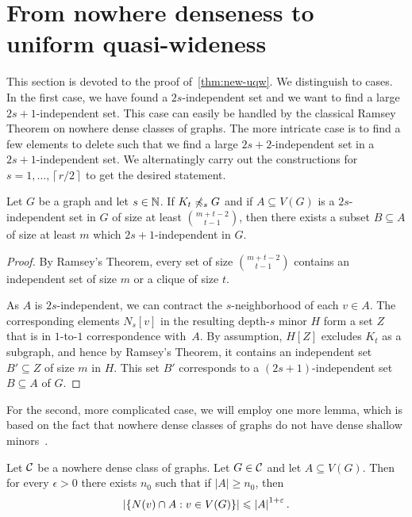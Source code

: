 \section{From nowhere denseness to uniform quasi-wideness}\label{sec:uqw}

This section is devoted to the proof of~\cref{thm:new-uqw}. 
We distinguish to cases. In the first case, we have found a 
$2s$-independent set and we want to find a large $2s+1$-independent
set. This case can easily be handled by the classical Ramsey 
Theorem on nowhere dense classes of graphs. The more
intricate case is to find a few elements to delete such that
we find a large $2s+2$-independent set in a $2s+1$-independent set. 
We alternatingly carry out the constructions for $s=1,\ldots, \left\lceil r/2\right\rceil$ to 
get the desired statement. 


\begin{lemma}\label{lem:ramsey1}
Let $G$ be a graph and let $s\in \mathbb{N}$. If $K_t\not\preccurlyeq_{s} G$ and 
if $A\subseteq V(G)$ is a $2s$-independent set in $G$ of
size at least $\binom{m+t-2}{t-1}$, then there exists
a subset $B\subseteq A$ of size at least $m$ which $2s+1$-independent in $G$. 
\end{lemma}
\begin{proof}
By Ramsey's Theorem, every set of size $\binom{m+t-2}{t-1}$ contains an
independent set of size $m$ or a clique of size $t$. 

As $A$ is $2s$-independent, we can contract the $s$-neighborhood
of each $v\in A$. The corresponding elements $N_s[v]$ in the resulting 
depth-$s$ minor $H$ form a set $Z$ that is in \mbox{$1$-to-$1$} correspondence 
with~$A$. By assumption, 
$H[Z]$ excludes $K_t$ as a subgraph, and hence by Ramsey's Theorem,
it contains an independent set $B'\subseteq Z$ of size $m$ in $H$. 
This set $B'$ corresponds to a $(2s+1)$-independent set $B\subseteq A$ of $G$. 
\end{proof}

For the second, more complicated case, 
we will employ one more lemma, which is based on the fact that
nowhere dense classes of graphs do not have dense 
shallow minors~\cite{dvorak2007asymptotical,jiang2011compact}. 

\begin{lemma}\label{lem:diversity}
Let $\mathcal{C}$ be a nowhere dense class of graphs. Let $G\in \mathcal{C}$ and let $A\subseteq V(G)$. 
Then for every $\epsilon>0$ there exists $n_0$ such that if $|A|\geq n_0$, then 
\[\left\lvert\{N(v)\cap A : v\in V(G)\}\right\rvert\leqslant\left\lvert A\right\rvert^{1+\varepsilon}.\]
\end{lemma}

